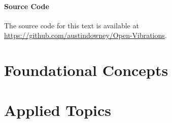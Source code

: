 \documentclass[12pt,letter]{article}
\begin{document}
\subsection{Source Code}
The source code for this text is available at \url{https://github.com/austindowney/Open-Vibrations}.







\pagebreak

\setcounter{secnumdepth}{3} %
\setcounter{page}{1}


\part{Foundational Concepts}
\pagebreak

\graphicspath{{Chapter_1_fundamentals_of_vibrations/}} 










\part{Applied Topics}







%


\pagebreak
\renewcommand{\thepage}{}
\renewcommand\refname{References Cited}
\pagestyle{plain}


\end{document}
